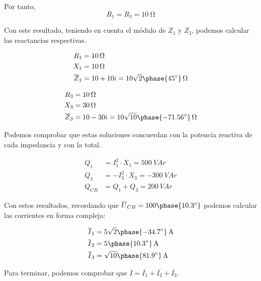 \documentclass[12pt]{article}
\begin{document}
\begin{enumerate}[resume]
Por tanto, 
\[
   R_1 = R_3 = \SI{10}{\ohm}              
\]

Con este resultado, teniendo en cuenta el módulo de $Z_1$ y $Z_3$,
podemos calcular las reactancias respectivas.

\begin{align*}
  R_1 &= \SI{10}{\ohm}\\
  X_1 &= \SI{10}{\ohm}\\
  \overline{Z}_1 &= 10 + 10i = \SI[parse-numbers=false]{10\sqrt{2}\phase{\ang{45}}}{\ohm}
\end{align*}

\begin{align*}
  R_3 &= \SI{10}{\ohm}\\
  X_3 &= \SI{30}{\ohm}\\
  \overline{Z}_3 &= 10 - 30i = \SI[parse-numbers=false]{10\sqrt{10}\phase{\ang{-71.56}}}{\ohm}
\end{align*}

Podemos comprobar que estas soluciones concuerdan con la potencia
reactiva de cada impedancia y con la total.

\begin{align*}
  Q_1 &= I_1^2 \cdot X_1 = \SI{500}{VA}r\\
  Q_3 &= - I_3^2 \cdot X_3 = \SI{-300}{VA}r\\
  Q_{CB} &= Q_1 + Q_3 =\SI{200}{VA}r
\end{align*}

Con estos resultados, recordando que  $\overline{U}_{CB} =
100\phase{\ang{10.3}}$ podemos calcular las corrientes en forma
compleja:

\begin{align*}
  \overline{I}_1 &=  \SI[parse-numbers=false]{5\sqrt{2}\phase{\ang{-34.7}}}{\ampere}\\
  \overline{I}_2 &=  \SI[parse-numbers=false]{5\phase{\ang{10.3}}}{\ampere}\\
  \overline{I}_3 &=
  \SI[parse-numbers=false]{\sqrt{10}\phase{\ang{81.9}}}{\ampere}
\end{align*}

Para terminar, podemos comprobar que $\overline{I} = \overline{I_1}
+ \overline{I_2} + \overline{I_3}$.
\end{enumerate}

\clearpage{}

\section{}
\end{document}
